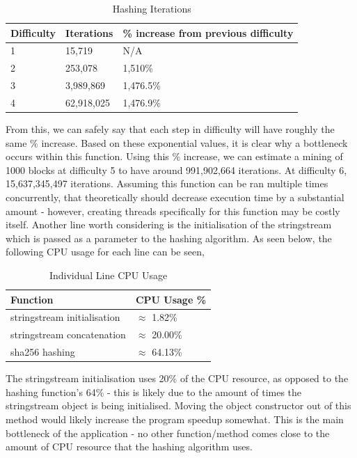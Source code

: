 \documentclass[12pt, a4paper]{article}
\begin{document}
\begin{table}[H]
    \centering
    \begin{tabular}{| l | l | l |}
    \hline
    Difficulty & Iterations & \% increase from previous difficulty \\ \hline
    1 & 15,719 & N/A \\ \hline
    2 & 253,078 & 1,510\% \\ \hline
    3 & 3,989,869 & 1,476.5\% \\ \hline
    4 & 62,918,025 & 1,476.9\% \\ \hline
    \end{tabular}
    \caption{Hashing Iterations}
\end{table}

From this, we can safely say that each step in difficulty will have roughly the same \% increase. Based on these exponential values, it is clear why a bottleneck occurs within this function. Using this \% increase, we can estimate a mining of 1000 blocks at difficulty 5 to have around 991,902,664 iterations. At difficulty 6, 15,637,345,497 iterations. Assuming this function can be ran multiple times concurrently, that theoretically should decrease execution time by a substantial amount - however, creating threads specifically for this function may be costly itself. Another line worth considering is the initialisation of the stringstream which is passed as a parameter to the hashing algorithm. As seen below, the following CPU usage for each line can be seen, \\

\begin{table}[H]
    \centering
    \begin{tabular}{| l | l |}
    \hline
    Function & CPU Usage \%  \\ \hline
    stringstream initialisation & $\approx$ 1.82\% \\ \hline
    stringstream concatenation & $\approx$ 20.00\% \\ \hline
    sha256 hashing & $\approx$ 64.13\% \\ \hline
    \end{tabular}
    \caption{Individual Line CPU Usage}
\end{table}

The stringstream initialisation uses 20\% of the CPU resource, as opposed to the hashing function's 64\% - this is likely due to the amount of times the stringstream object is being initialised. Moving the object constructor out of this method would likely increase the program speedup somewhat. This is the main bottleneck of the application - no other function/method comes close to the amount of CPU resource that the hashing algorithm uses. 
\end{document}
